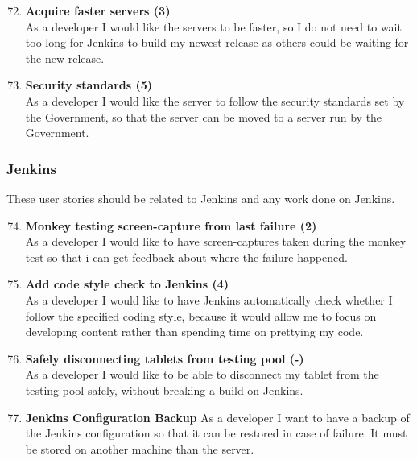 \begin{enumerate}
	\setcounter{enumi}{71} %
	\item \textbf{Acquire faster servers (3)} \\
	As a developer I would like the servers to be faster, so I do not need to wait too long for Jenkins to build my newest release as others could be waiting for the new release.
	
	\item \textbf{Security standards (5)} \\
	As a developer I would like the server to follow the security standards set by the Government, so that the server can be moved to a server run by the Government.
\end{enumerate}

\subsubsection{Jenkins}
These user stories should be related to Jenkins and any work done on Jenkins.

\begin{enumerate}
	\setcounter{enumi}{73} %
	\item \textbf{Monkey testing screen-capture from last failure (2)}\\
	As a developer I would like to have screen-captures taken during the monkey test so that i can get feedback about where the failure happened. 
	
	\item \textbf{Add code style check to Jenkins (4)}\\
	As a developer I would like to have Jenkins automatically check whether I follow the specified coding style, because it would allow me to focus on developing content rather than spending time on prettying my code.
	
	\item \textbf{Safely disconnecting tablets from testing pool (-)}\\
	As a developer I would like to be able to disconnect my tablet from the testing pool safely, without breaking a build on Jenkins.
	
	\item \textbf{Jenkins Configuration Backup}
	As a developer I want to have a backup of the Jenkins configuration so that it can be restored in case of failure. It must be stored on another machine than the server.
\end{enumerate}

